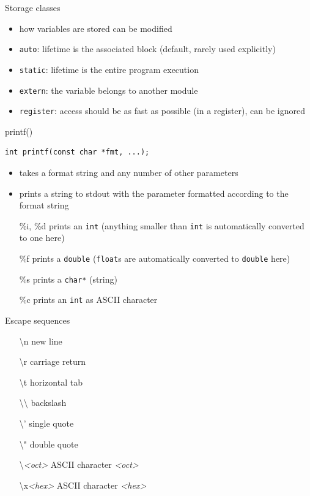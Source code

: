 \documentclass[english,compress]{beamer}
\begin{document}
\begin{frame}{Storage classes}
	\begin{itemize}
		\item how variables are stored can be modified
		\item \lstinline|auto|: lifetime is the associated block (default, rarely used explicitly)
		\item \lstinline|static|: lifetime is the entire program execution
		\item \lstinline|extern|: the variable belongs to another module
		\item \lstinline|register|: access should be as fast as possible (in a register), can be ignored
	\end{itemize}
\end{frame}

\begin{frame}[fragile]{printf()}
	\begin{lstlisting}[numbers=none]
		int printf(const char *fmt, ...);
	\end{lstlisting}
	\begin{itemize}
		\item takes a format string and any number of other parameters
		\item prints a string to stdout with the parameter formatted according to the format string
		\item[\%i, \%d] prints an \lstinline|int| (anything smaller than  \lstinline|int| is automatically converted to one here)
		\item[\%f] prints a \lstinline|double| (\lstinline|float|s are automatically converted to \lstinline|double| here)
		\item[\%s] prints a \lstinline|char*| (string)
		\item[\%c] prints an \lstinline|int| as ASCII character
	\end{itemize}
\end{frame}

\begin{frame}{Escape sequences}
	\begin{itemize}
		\item[\textbackslash n] new line
		\item[\textbackslash r] carriage return
		\item[\textbackslash t] horizontal tab
		\item[\textbackslash\textbackslash] backslash
		\item[\textbackslash '] single quote
		\item[\textbackslash "] double quote
		\item[\textbackslash \textit{<oct>}] ASCII character \textit{<oct>}
		\item[\textbackslash x\textit{<hex>}] ASCII character \textit{<hex>}
	\end{itemize}
\end{frame}
\end{document}

